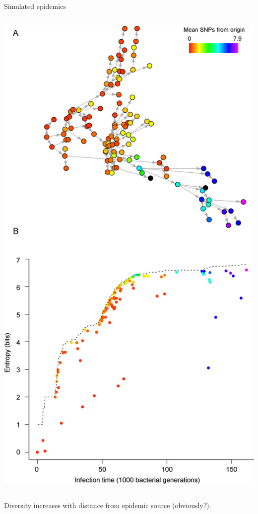 \documentclass{beamer}
\begin{document}
\begin{frame}{Simulated epidemics}
\begin{columns}
\begin{column}{0.5\textwidth}
            \includegraphics[width=\textwidth, trim=0 0 0 1.1in, clip=true]{f4}
        \end{column}
    \end{columns}

    \begin{center}
        Diversity increases with distance from epidemic source (obviously?).
    \end{center}
\end{frame}
\end{document}

